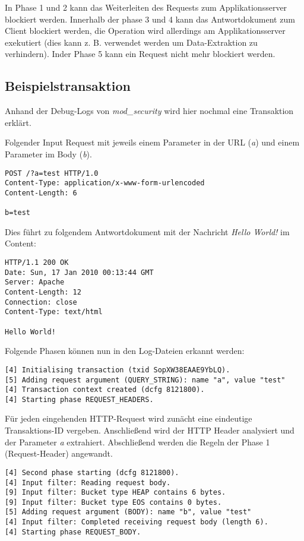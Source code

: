 In Phase 1 und 2 kann das Weiterleiten des Requests zum Applikationsserver blockiert werden. Innerhalb der phase 3 und 4 kann das Antwortdokument zum Client blockiert werden, die Operation wird allerdings am Applikationsserver exekutiert (dies kann z. B. verwendet werden um Data-Extraktion zu verhindern). Inder Phase 5 kann ein Request nicht mehr blockiert werden.

\subsection{Beispielstransaktion}

Anhand der Debug-Logs von \textit{mod\_security} wird hier nochmal eine Transaktion erklärt.

Folgender Input Request mit jeweils einem Parameter in der URL (\textit{a}) und einem Parameter im Body (\textit{b}).

\begin{verbatim}
POST /?a=test HTTP/1.0
Content-Type: application/x-www-form-urlencoded
Content-Length: 6

b=test
\end{verbatim}

Dies führt zu folgendem Antwortdokument mit der Nachricht \textit{Hello World!} im Content:

\begin{verbatim}
HTTP/1.1 200 OK
Date: Sun, 17 Jan 2010 00:13:44 GMT
Server: Apache
Content-Length: 12
Connection: close
Content-Type: text/html

Hello World!
\end{verbatim}

Folgende Phasen können nun in den Log-Dateien erkannt werden:

\begin{verbatim}
[4] Initialising transaction (txid SopXW38EAAE9YbLQ).
[5] Adding request argument (QUERY_STRING): name "a", value "test"
[4] Transaction context created (dcfg 8121800).
[4] Starting phase REQUEST_HEADERS.
\end{verbatim}

Für jeden eingehenden HTTP-Request wird zunächt eine eindeutige Transaktions-ID vergeben. Anschließend wird der HTTP Header analysiert und der Parameter \textit{a} extrahiert. Abschließend werden die Regeln der Phase 1 (Request-Header) angewandt.

\begin{verbatim}
[4] Second phase starting (dcfg 8121800).
[4] Input filter: Reading request body.
[9] Input filter: Bucket type HEAP contains 6 bytes.
[9] Input filter: Bucket type EOS contains 0 bytes.
[5] Adding request argument (BODY): name "b", value "test"
[4] Input filter: Completed receiving request body (length 6).
[4] Starting phase REQUEST_BODY.
\end{verbatim}

